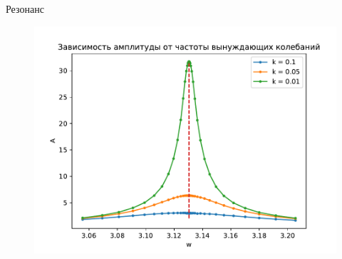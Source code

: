             Резонанс
            \begin{figure}[H]
                \centering
                \includegraphics[width=15cm]{pictures/6resonance2.pdf}
            \end{figure}